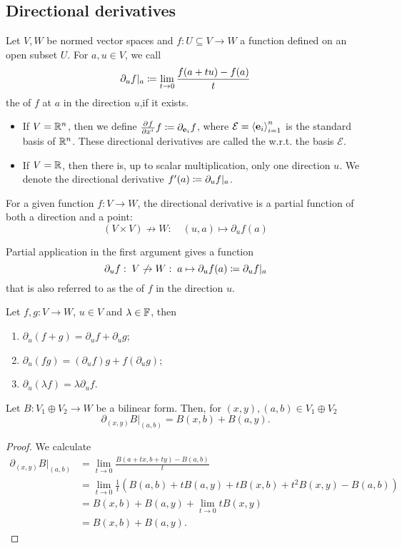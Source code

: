 \subsection{Directional derivatives}
\begin{definition}
Let $V,W$ be normed vector spaces and $f:U\subseteq V\to W$ a function defined on an open subset $U$. For $a,u\in V$, we call
\[ \partial_u f|_a \coloneqq \lim_{t\to 0} \frac{f(a+tu) - f(a)}{t} \]
the  of $f$ at $a$ in the direction $u$,if it exists.

\begin{itemize}
\item If $V= \mathbb{R}^n$, then we define $ \frac{\partial{^{}}f}{\partial{{x^i}^{}}} f \coloneqq \partial_{\boldsymbol{\mathrm{e}}_i}f$, where $\mathcal{E} = \left\langle \boldsymbol{\mathrm{e}}_i \right\rangle_{i=1}^n$ is the standard basis of $\mathbb{R}^n$. These directional derivatives are called the  w.r.t. the basis $\mathcal{E}$.
\item If $V = \mathbb{R}$, then there is, up to scalar multiplication, only one direction $u$. We denote the directional derivative $f'(a) \coloneqq \partial_u f|_a$.
\end{itemize}
\end{definition}
For a given function $f:V\to W$, the directional derivative is a partial function of both a direction and a point:
\[ (V\times V) \not\to W:\quad (u,a) \mapsto \partial_u f(a)  \]

Partial application in the first argument gives a function
\[ \partial_u f:\; V\not\to W:\; a\mapsto \partial_u f(a) \coloneqq \partial_u f|_a \]
that is also referred to as the  of $f$ in the direction $u$.

\begin{lemma}
Let $f,g: V\to W$, $u\in V$ and $\lambda\in\mathbb{F}$, then
\begin{enumerate}
\item $\partial_u(f+g) = \partial_uf + \partial_u g$;
\item $\partial_u(fg) = (\partial_uf)g + f(\partial_u g)$;
\item $\partial_u(\lambda f) = \lambda \partial_uf$.
\end{enumerate}
\end{lemma}

\begin{proposition} \label{derivativeBilinearForm}
Let $B: V_1 \oplus V_2 \to W$ be a bilinear form. Then, for $(x,y),(a,b)\in V_1\oplus V_2$
\[ \partial_{(x,y)}B|_{(a,b)} = B(x,b) + B(a,y). \]
\end{proposition}
\begin{proof}
We calculate
\begin{align*}
\partial_{(x,y)}B|_{(a,b)} &= \lim_{t\to 0} \frac{B(a+tx, b+ty) - B(a,b)}{t} \\
&= \lim_{t\to 0} \frac{1}{t} (B(a,b) + tB(a,y) + tB(x,b) + t^2B(x,y) - B(a,b)) \\
&=B(x,b) + B(a,y) + \lim_{t\to 0} tB(x,y) \\
&= B(x,b) + B(a,y).
\end{align*}
\end{proof}

